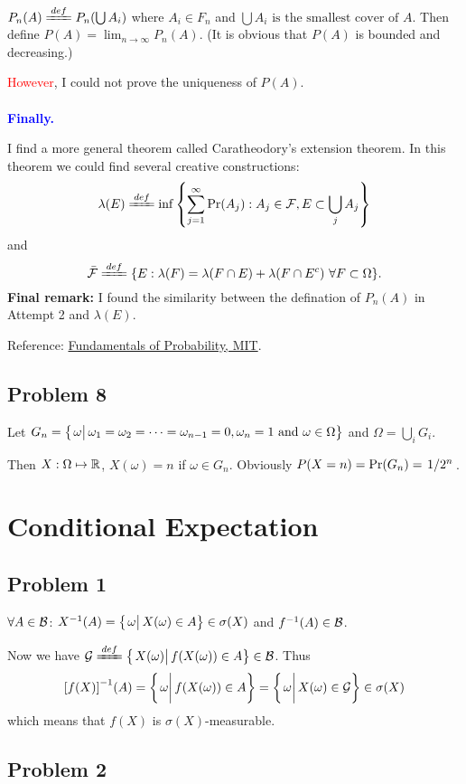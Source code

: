 \documentclass{article}
\begin{document}
$P_n(A)\deq P_n(\bigcup A_i)$ where $A_i\in F_n$ and $\bigcup A_i\mbox{ is the smallest cover of }A$. Then define $P(A)=\lim_{n\to\infty}P_n(A)$. (It is obvious that $P(A)$ is bounded and decreasing.)

\textcolor{red}{However}, I could not prove the uniqueness of $P(A)$.
\\
\\
\textcolor{blue}{\textbf{Finally.}}

I find a more general theorem called Caratheodory's extension theorem. In this theorem we could find several creative constructions:
\[
	\lambda(E)\deq\inf\set{\sum_{j=1}^\infty\Pr(A_j):A_j\in\+F,E\subset\bigcup_j A_j}
\] and 
\[
	\bar{\+F}\deq\set{E:\lambda(F)=\lambda(F\cap E)+\lambda(F\cap E^c)\ \forall F\subset\Omega}
.\] 
\textbf{Final remark:} I found the similarity between the defination of $P_n(A)$ in Attempt 2 and  $\lambda(E)$.

Reference: \href{https://ocw.mit.edu/courses/electrical-engineering-and-computer-science/6-436j-fundamentals-of-probability-fall-2018/lecture-notes/MIT6_436JF18_lec02.pdf}{Fundamentals of Probability, MIT}.

\subsection*{\centering Problem 8}

Let $G_n=\set{\eval{\omega}\omega_1=\omega_2=\cdots=\omega_{n-1}=0,\omega_n=1 \mbox{ and } \omega\in\Omega}$ and $\Omega=\bigcup_i{G_i}$.

Then $X:\Omega\mapsto \mathbb{R}$, $X(\omega)=n$ if $\omega\in G_n$.
Obviously $P(X=n)=\Pr(G_n)=\flatfrac{1}{2^n}$.


\section{Conditional Expectation}
\subsection*{\centering Problem 1}
$\forall A\in\mathcal{B}$: $X^{-1}(A)=\set{\eval{\omega}X(\omega)\in A}\in\sigma(X)$ and $f^{-1}(A)\in\mathcal{B}$.

Now we have $\+G\deq\set{\eval{X(\omega)}f(X(\omega))\in A}\in\+B$.
Thus 
\[
	\qty[f(X)]^{-1}(A)=\set{\eval{\omega}f(X(\omega))\in A}=\set{\eval{\omega}X(\omega)\in\+G}\in\sigma(X)
\]
which means that $f(X)$ is $\sigma(X)$-measurable.

\subsection*{\centering Problem 2}
\end{document}
